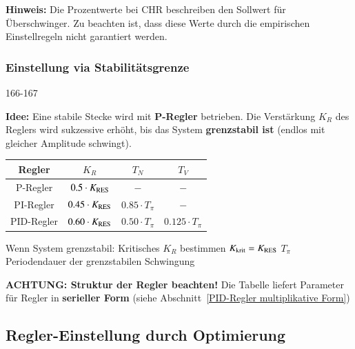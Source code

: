\textbf{Hinweis:} Die Prozentwerte bei CHR beschreiben den Sollwert für Überschwinger.
Zu beachten ist, dass diese Werte durch die empirischen Einstellregeln nicht garantiert werden.


\subsubsection{Einstellung via Stabilitätsgrenze}{166-167}

\textbf{Idee:} Eine stabile Stecke wird mit \textbf{P-Regler} betrieben. Die Verstärkung $K_R$ des Reglers wird sukzessive erhöht,
bis das System \textbf{grenzstabil ist} (endlos mit gleicher Amplitude schwingt).

\begin{minipage}[c]{0.55\columnwidth}
    \begin{tabular}{|c | c | c | c|}
        \toprule
        Regler      & $K_R$                     & $T_N$                 & $T_V$                 \\
        \midrule
        P-Regler    & $0.5 \cdot K_{\rm RES}$   & $-$                   & $-$                   \\
        \midrule
        PI-Regler   & $0.45 \cdot K_{\rm RES}$  & $0.85 \cdot T_{\pi}$  & $-$                   \\
        \midrule
        PID-Regler  & $0.60 \cdot K_{\rm RES}$  & $0.50 \cdot T_{\pi}$  & $0.125 \cdot T_{\pi}$ \\
        \bottomrule
    \end{tabular}
\end{minipage}
\hfill
\begin{minipage}[c]{0.42\columnwidth}
    \begin{center}
        \textbf{}
    \end{center}

    \begin{outline}
        \1 Wenn System grenzstabil: Kritisches $K_R$ bestimmen
            \2 $K_{\rm krit} = K_{\rm RES}$
        \1 $T_{\pi}$ Periodendauer der grenzstabilen Schwingung 
    \end{outline}
\end{minipage}

\textbf{ACHTUNG: Struktur der Regler beachten!} Die Tabelle liefert Parameter für Regler in \textbf{serieller Form}
(siehe Abschnitt~\ref{PID-Regler multiplikative Form}) 


\subsection{Regler-Einstellung durch Optimierung}
